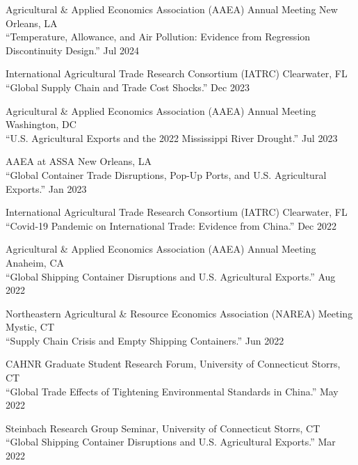 \documentclass[10.5pt,letterpaper]{article}
\renewenvironment{itemize}{
	\begin{list}{}{
			\setlength{\leftmargin}{1.5em}
		}
	}{
	\end{list}
}
\begin{document}
\begin{itemize}
	
	\item[-] Agricultural \& Applied Economics Association (AAEA) Annual Meeting \hfill New Orleans, LA \\
	“Temperature, Allowance, and Air Pollution: Evidence from Regression Discontinuity Design.” \hfill Jul 2024  
	
	\item[-] International Agricultural Trade Research Consortium (IATRC) \hfill Clearwater, FL \\
	“Global Supply Chain and Trade Cost Shocks.” \hfill Dec 2023  
	
	\item[-] Agricultural \& Applied Economics Association (AAEA) Annual Meeting \hfill Washington, DC \\
	“U.S. Agricultural Exports and the 2022 Mississippi River Drought.” \hfill Jul 2023  
	
	\item[-] AAEA at ASSA \hfill New Orleans, LA \\
	“Global Container Trade Disruptions, Pop-Up Ports, and U.S. Agricultural Exports.” \hfill Jan 2023  
	
	\item[-] International Agricultural Trade Research Consortium (IATRC) \hfill Clearwater, FL \\
	“Covid-19 Pandemic on International Trade: Evidence from China.” \hfill Dec 2022  
	
	\item[-] Agricultural \& Applied Economics Association (AAEA) Annual Meeting \hfill Anaheim, CA \\
	“Global Shipping Container Disruptions and U.S. Agricultural Exports.” \hfill Aug 2022  
	
	\item[-] Northeastern Agricultural \& Resource Economics Association (NAREA) Meeting \hfill Mystic, CT \\
	“Supply Chain Crisis and Empty Shipping Containers.” \hfill Jun 2022  
	
	\item[-] CAHNR Graduate Student Research Forum, University of Connecticut \hfill Storrs, CT \\
	“Global Trade Effects of Tightening Environmental Standards in China.” \hfill May 2022  
	
	\item[-] Steinbach Research Group Seminar, University of Connecticut \hfill Storrs, CT \\
	“Global Shipping Container Disruptions and U.S. Agricultural Exports.” \hfill Mar 2022  
	

\end{itemize}
\end{document}
